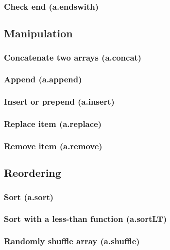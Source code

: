 \documentclass{article}
\theoremstyle{definition}
\begin{document}
\subsubsection{Check end (a.endswith)}

\subsection{Manipulation}

\subsubsection{Concatenate two arrays (a.concat)}

\subsubsection{Append (a.append)}

\subsubsection{Insert or prepend (a.insert)}

\subsubsection{Replace item (a.replace)}

\subsubsection{Remove item (a.remove)}

\subsection{Reordering}

\subsubsection{Sort (a.sort)}

\subsubsection{Sort with a less-than function (a.sortLT)}

\subsubsection{Randomly shuffle array (a.shuffle)}
\end{document}

